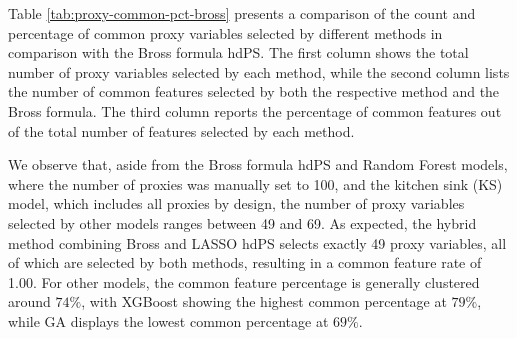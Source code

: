 \documentclass[10pt,letterpaper]{article}
\begin{document}
Table \ref{tab:proxy-common-pct-bross} presents a comparison of the
count and percentage of common proxy variables selected by different
methods in comparison with the Bross formula hdPS. The first column
shows the total number of proxy variables selected by each method, while
the second column lists the number of common features selected by both
the respective method and the Bross formula. The third column reports
the percentage of common features out of the total number of features
selected by each method.

We observe that, aside from the Bross formula hdPS and Random Forest
models, where the number of proxies was manually set to 100, and the
kitchen sink (KS) model, which includes all proxies by design, the
number of proxy variables selected by other models ranges between 49 and
69. As expected, the hybrid method combining Bross and LASSO hdPS
selects exactly 49 proxy variables, all of which are selected by both
methods, resulting in a common feature rate of 1.00. For other models,
the common feature percentage is generally clustered around \(74\%\),
with XGBoost showing the highest common percentage at \(79\%\), while GA
displays the lowest common percentage at \(69\%\).
\end{document}

